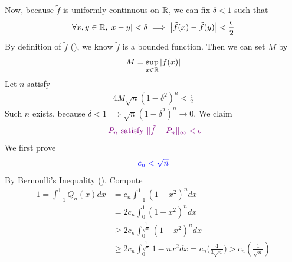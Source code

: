 \documentclass{report}
\begin{document}
\begin{proof*}
Now, because $\tilde{f}$ is uniformly continuous on $\mathbb{R}$, we can fix $\delta<1$ such that 
\begin{align}
\label{tse5}
\forall x,y \in\mathbb{R}, \left|x-y\right|<\delta \implies \left|\tilde{f}(x)-\tilde{f}(y)  \right|<\frac{\epsilon}{2}
\end{align}
By definition of $\tilde{f}$ (), we know $\tilde{f} $ is a bounded function. Then we can set $M$ by 
\begin{align*}
M=\sup_{x \in\mathbb{R}} \left|f(x)\right|
\end{align*}
Let $n$ satisfy 
 \begin{align}
  \label{tse5}
4M \sqrt{n} (1-\delta^2)^n < \frac{\epsilon}{2} 
\end{align}
Such $n$ exists, because  $\delta<1 \implies  \sqrt{n}(1-\delta^2)^n \to 0 $. We claim 
\begin{align*}
\textcolor{violet}{\text{ $P_n$ satisfy $\| \tilde{f}-P_n \|_{\infty}<\epsilon $}}
\end{align*}
We first prove 
\begin{align*}
\textcolor{blue}{c_n< \sqrt{n} }
\end{align*}
By Bernoulli's Inequality (). Compute 
\begin{align*}
1=\int_{-1}^1 Q_n(x)dx&=  c_n\int_{-1}^1 (1-x^2)^n dx \\
&=2c_n\int_0^1 (1-x^2)^n dx\\
&\geq 2c_n\int_0^{\frac{1}{\sqrt{n} }}(1-x^2)^n dx\\
&\geq 2c_n \int_0^{\frac{1}{\sqrt{n} }} 1-nx^2dx=c_n\big(\frac{4}{3\sqrt{n} } \big)> c_n (\frac{1}{\sqrt{n} })
\end{align*}



\end{proof*}
\end{document}
